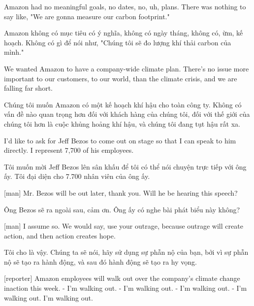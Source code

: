 \documentclass[a4paper]{article}
\begin{document}
	Amazon had no meaningful goals, no dates, no, uh, plans.
	There was nothing to say like, "We are gonna measure our carbon footprint."
	
	\begin{vietnamese-v2}
		Amazon không có mục tiêu có ý nghĩa, không có ngày tháng, không có, ừm, kế hoạch.
		Không có gì để nói như, "Chúng tôi sẽ đo lượng khí thải carbon của mình."
	\end{vietnamese-v2}
	
	We wanted Amazon to have a company-wide climate plan.
	There's no issue more important to our customers, to our world, than the climate crisis, and we are falling far short.
	
	\begin{vietnamese-v2}
		Chúng tôi muốn Amazon có một kế hoạch khí hậu cho toàn công ty.
		Không có vấn đề nào quan trọng hơn đối với khách hàng của chúng tôi, đối với thế giới của chúng tôi hơn là cuộc khủng hoảng khí hậu, và chúng tôi đang tụt hậu rất xa.	
	\end{vietnamese-v2}
	
	I'd like to ask for Jeff Bezos to come out on stage so that I can speak to him directly.
	I represent 7,700 of his employees.
	
	\begin{vietnamese-v2}
		Tôi muốn mời Jeff Bezos lên sân khấu để tôi có thể nói chuyện trực tiếp với ông ấy.
		Tôi đại diện cho 7.700 nhân viên của ông ấy.
	\end{vietnamese-v2}
	
	[man] Mr. Bezos will be out later, thank you.
	Will he be hearing this speech?
	
	\begin{vietnamese-v2}
		[man] Ông Bezos sẽ ra ngoài sau, cảm ơn.
		Ông ấy có nghe bài phát biểu này không?
	\end{vietnamese-v2}
	
	[man] I assume so.
	We would say, use your outrage, because outrage will create action, and then action creates hope.
	
	\begin{vietnamese-v2}
		 Tôi cho là vậy.
		Chúng ta sẽ nói, hãy sử dụng sự phẫn nộ của bạn, bởi vì sự phẫn nộ sẽ tạo ra hành động, và sau đó hành động sẽ tạo ra hy vọng.
	\end{vietnamese-v2}
	
	[reporter] Amazon employees will walk out over the company's climate change inaction this week.
	- I'm walking out. - I'm walking out.
	- I'm walking out. - I'm walking out.
	I'm walking out.
	
\end{document}
